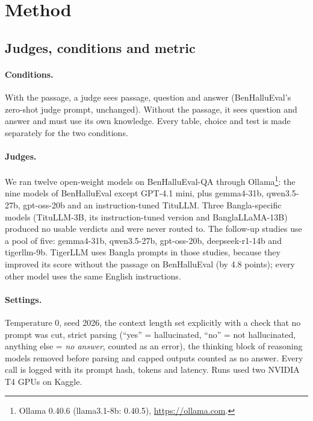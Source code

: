 \documentclass[11pt]{article}
\begin{document}
\section{Method}\label{sec:method}

\subsection{Judges, conditions and metric}

\paragraph{Conditions.} With the passage, a judge sees passage, question and answer (BenHalluEval's zero-shot judge
prompt, unchanged). Without the passage, it sees question and answer and must use its own knowledge. Every table,
choice and test is made separately for the two conditions.

\paragraph{Judges.} We ran twelve open-weight models on BenHalluEval-QA through Ollama\footnote{Ollama 0.40.6
(llama3.1-8b: 0.40.5), \url{https://ollama.com}.}: the nine models of BenHalluEval except GPT-4.1 mini, plus
gemma4-31b, qwen3.5-27b, gpt-oss-20b and an instruction-tuned TituLLM. Three Bangla-specific models (TituLLM-3B, its
instruction-tuned version and BanglaLLaMA-13B) produced no usable verdicts and were never routed to. The follow-up
studies use a pool of five: gemma4-31b, qwen3.5-27b, gpt-oss-20b, deepseek-r1-14b and tigerllm-9b. TigerLLM uses Bangla
prompts in those studies, because they improved its score without the passage on BenHalluEval (by 4.8 points);
every other model uses the same English instructions.

\paragraph{Settings.} Temperature 0, seed 2026, the context length set explicitly with a check that no prompt was cut,
strict parsing (``yes'' = hallucinated, ``no'' = not hallucinated, anything else = \emph{no answer}, counted as an
error), the thinking block of reasoning models removed before parsing and capped outputs counted as no answer. Every
call is logged with its prompt hash, tokens and latency. Runs used two NVIDIA T4 GPUs on Kaggle.
\end{document}
